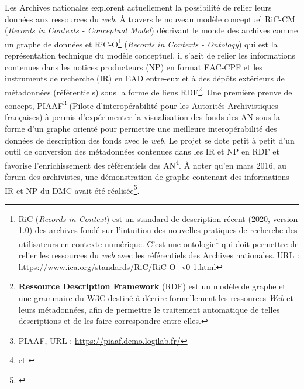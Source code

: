 Les Archives nationales explorent actuellement la possibilité de relier leurs données aux ressources du \textit{web}. À travers le nouveau modèle conceptuel RiC-CM (\textit{Records in Contexts - Conceptual Model}) décrivant le monde des archives comme un graphe de données et RiC-O\footnote{RiC (\textit{Records in Context}) est un standard de description récent (2020, version 1.0) des archives fondé sur l'intuition des nouvelles pratiques de recherche des utilisateurs en contexte numérique. C'est une ontologie\footnote{une ontologie est un ensemble structuré d'objets et de concepts qui reliés entre eux font sens. Il s'agit de modéliser un ensemble de connaissances dans un domaine particulier pour les rendre compréhensibles par un ordinateur.} qui doit permettre de relier les ressources du \textit{web} avec les référentiels des Archives nationales. URL : \url{https://www.ica.org/standards/RiC/RiC-O_v0-1.html}} (\textit{Records in Contexts - Ontology}) qui est la représentation technique du modèle conceptuel, il s'agit de relier les informations contenues dans les notices producteurs (NP) en format EAC-CPF et les instruments de recherche (IR) en EAD entre-eux et à des dépôts extérieurs de métadonnées (référentiels) sous la forme de liens RDF\footnote{\textbf{Ressource Description Framework} (RDF) est un modèle de graphe et une grammaire du W3C destiné à décrire formellement les ressources \textit{Web} et leurs métadonnées, afin de permettre le traitement automatique de telles descriptions et de les faire correspondre entre-elles.}. Une première preuve de concept, PIAAF\footnote{PIAAF, URL : \url{https://piaaf.demo.logilab.fr/}} (Pilote d'interopérabilité pour les Autorités Archivistiques françaises) à permis d'expérimenter la visualisation des fonds des AN sous la forme d'un graphe orienté pour permettre une meilleure interopérabilité des données de description des fonds avec le \textit{web}. Le projet se dote petit à petit d'un outil de conversion des métadonnées contenues dans les IR et NP en RDF et favorise l'enrichissement des référentiels des AN\footnote{\cite{clavaud_records_2020} et \cite{angjeli_representer_2017}}. À noter qu'en mars 2016, au forum des archivistes, une démonstration de graphe contenant des informations IR et NP du DMC avait été réalisée\footnote{\cite{clavaud_vers_2016}}.\\

